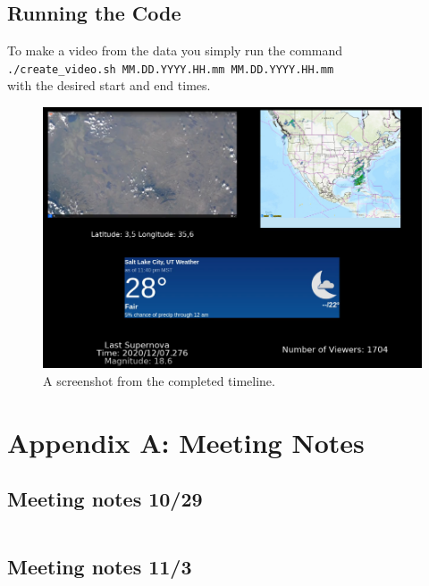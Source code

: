 \documentclass{article}
\begin{document}
  \subsection{Running the Code}
   To make a video from the data you simply run the command \\ \verb|./create_video.sh MM.DD.YYYY.HH.mm MM.DD.YYYY.HH.mm|\\ with the desired start and end times.
  \begin{figure}[H]
    \centering
    \includegraphics[width=\linewidth]{img/timeline_screenshot.png}
    \caption{A screenshot from the completed timeline.} %
    \label{timeline}
  \end{figure}

\section{Appendix A: Meeting Notes}

\subsection{Meeting notes 10/29}
\inputminted[breaklines=true, linenos=true]{text}{../meeting_notes/meeting_notes_10_29.txt}

\subsection{Meeting notes 11/3}
\inputminted[breaklines=true, linenos=true]{text}{../meeting_notes/meeting_notes_11_3.txt}
\end{document}
